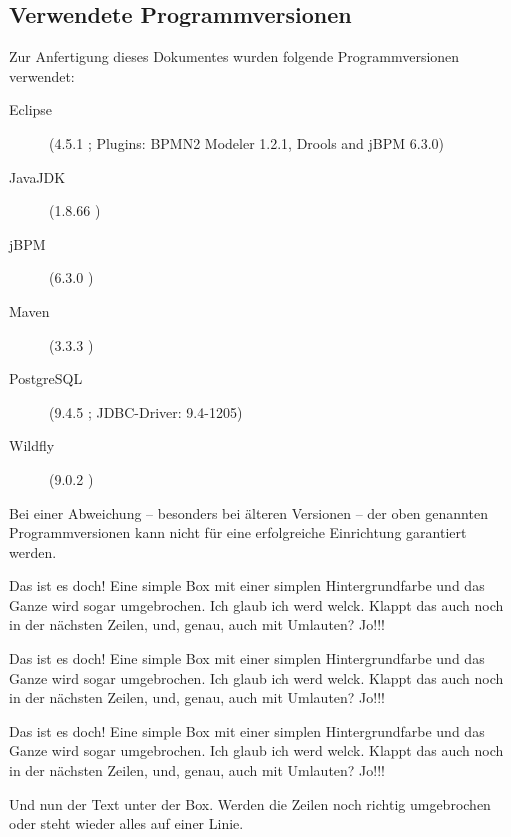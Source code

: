 \subsection{Verwendete Programmversionen}
Zur Anfertigung dieses Dokumentes wurden folgende Programmversionen verwendet:
\begin{description}
	\item[Eclipse] (4.5.1 ; Plugins: BPMN2 Modeler 1.2.1, Drools and jBPM 6.3.0)
	\item[JavaJDK] (1.8.66 ) 
	\item[jBPM] (6.3.0 )
	\item[Maven] (3.3.3 )
	\item[PostgreSQL] (9.4.5 ; JDBC-Driver: 9.4-1205)
	\item[Wildfly] (9.0.2 )
\end{description}
Bei einer Abweichung -- besonders bei älteren Versionen -- der oben genannten Programmversionen kann nicht für eine erfolgreiche Einrichtung garantiert werden.

\begin{hint}
	Das ist es doch! Eine simple Box mit einer simplen Hintergrundfarbe und das Ganze wird sogar umgebrochen. Ich glaub ich werd welck. Klappt das auch noch in der nächsten Zeilen, und, genau, auch mit Umlauten? Jo!!! 
\end{hint}

\begin{information}
	Das ist es doch! Eine simple Box mit einer simplen Hintergrundfarbe und das Ganze wird sogar umgebrochen. Ich glaub ich werd welck. Klappt das auch noch in der nächsten Zeilen, und, genau, auch mit Umlauten? Jo!!! 
\end{information}

\begin{warning}
	Das ist es doch! Eine simple Box mit einer simplen Hintergrundfarbe und das Ganze wird sogar umgebrochen. Ich glaub ich werd welck. Klappt das auch noch in der nächsten Zeilen, und, genau, auch mit Umlauten? Jo!!! 
\end{warning}

Und nun der Text unter der Box. Werden die Zeilen noch richtig umgebrochen oder steht wieder alles auf einer Linie.


